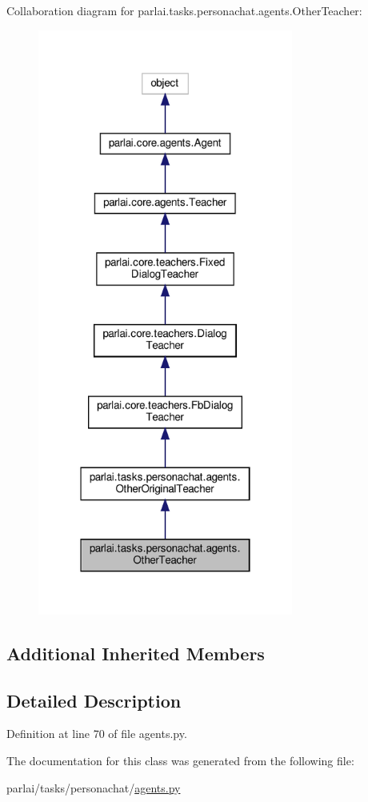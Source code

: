 Collaboration diagram for parlai.\+tasks.\+personachat.\+agents.\+Other\+Teacher\+:
\nopagebreak
\begin{figure}[H]
\begin{center}
\leavevmode
\includegraphics[width=238pt]{classparlai_1_1tasks_1_1personachat_1_1agents_1_1OtherTeacher__coll__graph}
\end{center}
\end{figure}
\subsection*{Additional Inherited Members}


\subsection{Detailed Description}


Definition at line 70 of file agents.\+py.



The documentation for this class was generated from the following file\+:\begin{DoxyCompactItemize}
\item 
parlai/tasks/personachat/\hyperlink{parlai_2tasks_2personachat_2agents_8py}{agents.\+py}\end{DoxyCompactItemize}
